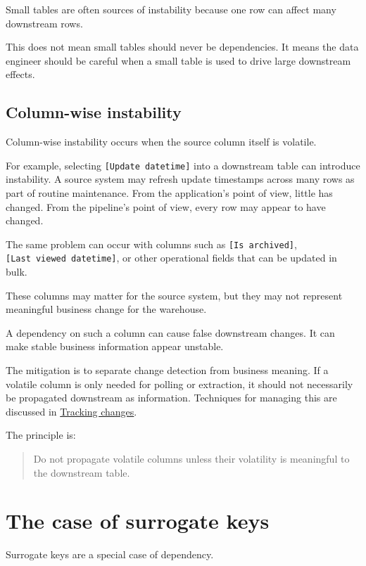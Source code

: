 \documentclass[10pt,openany,10pt]{book}
\begin{document}
Small tables are often sources of instability because one row can affect
many downstream rows.

This does not mean small tables should never be dependencies. It means
the data engineer should be careful when a small table is used to drive
large downstream effects.

\subsection{Column-wise instability}\label{column-wise-instability}

Column-wise instability occurs when the source column itself is
volatile.

For example, selecting \texttt{{[}Update\ datetime{]}} into a downstream
table can introduce instability. A source system may refresh update
timestamps across many rows as part of routine maintenance. From the
application's point of view, little has changed. From the pipeline's
point of view, every row may appear to have changed.

The same problem can occur with columns such as
\texttt{{[}Is\ archived{]}}, \texttt{{[}Last\ viewed\ datetime{]}}, or
other operational fields that can be updated in bulk.

These columns may matter for the source system, but they may not
represent meaningful business change for the warehouse.

A dependency on such a column can cause false downstream changes. It can
make stable business information appear unstable.

The mitigation is to separate change detection from business meaning. If
a volatile column is only needed for polling or extraction, it should
not necessarily be propagated downstream as information. Techniques for
managing this are discussed in
\hyperref[docs-efficient-stable-pipeline-tracking-changes]{Tracking
changes}.

The principle is:

\begin{quote}
Do not propagate volatile columns unless their volatility is meaningful
to the downstream table.
\end{quote}

\section{The case of surrogate keys}\label{the-case-of-surrogate-keys}

Surrogate keys are a special case of dependency.
\end{document}
